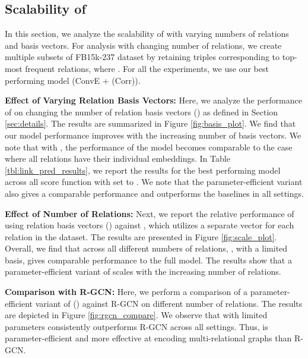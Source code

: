 \documentclass{article} \usepackage{iclr2020_conference,times}
\begin{document}
\vspace{-1mm}
\subsection{Scalability of \method{}} 
\label{sec:results_basis}
\vspace{-1mm}
In this section, we analyze the scalability of \method{} with varying numbers of relations and basis vectors. For analysis with changing number of relations, we create multiple subsets of FB15k-237 dataset by retaining triples corresponding to top- most frequent relations, where . For all the experiments, we use our best performing model (ConvE + \method{} (Corr)).

\textbf{Effect of Varying Relation Basis Vectors:} Here, we analyze the performance of \method{} on changing the number of relation basis vectors () as defined in Section \ref{sec:details}. 
The results are summarized in Figure \ref{fig:basis_plot}. We find that our model performance improves with the increasing number of basis vectors. We note that with , the performance of the model becomes comparable to the case where all relations have their individual embeddings. 
In Table \ref{tbl:link_pred_results}, we report the results for the best performing model across all score function with  set to . We note that the parameter-efficient variant also gives a comparable performance and outperforms the baselines in all settings. 

\textbf{Effect of Number of Relations:} Next, we report the relative performance of \method{} using  relation basis vectors () against \method{}, which utilizes a separate vector for each relation in the dataset. The results are presented in Figure \ref{fig:scale_plot}. Overall, we find that across all different numbers of relations, \method{}, with a limited basis, gives comparable performance to the full model. The results show that a parameter-efficient variant of \method{} scales with the increasing number of relations.



\textbf{Comparison with R-GCN:} Here, we perform a comparison of a parameter-efficient variant of \method{} () against R-GCN on different number of relations. The results are depicted in Figure \ref{fig:rgcn_compare}. We observe that \method{} with limited parameters consistently outperforms R-GCN across all settings. Thus, \method{} is parameter-efficient and more effective at encoding multi-relational graphs than R-GCN. 
\end{document}
